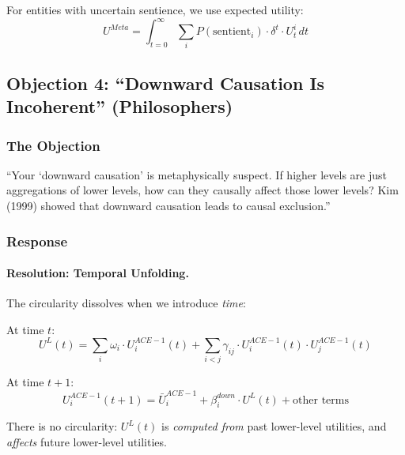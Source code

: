 For entities with uncertain sentience, we use expected utility:
\begin{equation}
U^{Meta} = \int_{t=0}^{\infty} \sum_{i} P(\text{sentient}_i) \cdot \delta^t \cdot U^i_t \, dt
\end{equation}

\subsection{Objection 4: ``Downward Causation Is Incoherent'' (Philosophers)}

\subsubsection{The Objection}

\begin{tcolorbox}[colback=red!5!white, colframe=red!75!black, title=Philosopher's Objection]
``Your `downward causation' is metaphysically suspect. If higher levels are 
just aggregations of lower levels, how can they causally affect those lower 
levels? Kim (1999) showed that downward causation leads to causal exclusion.''
\end{tcolorbox}

\subsubsection{Response}

\paragraph{Resolution: Temporal Unfolding.}

The circularity dissolves when we introduce \textit{time}:

At time $t$:
\begin{equation}
U^L(t) = \sum_i \omega_i \cdot U^{ACE-1}_i(t) + \sum_{i<j} \gamma_{ij} \cdot U^{ACE-1}_i(t) \cdot U^{ACE-1}_j(t)
\end{equation}

At time $t+1$:
\begin{equation}
U^{ACE-1}_i(t+1) = \bar{U}^{ACE-1}_i + \beta^{down}_i \cdot U^L(t) + \text{other terms}
\end{equation}

There is no circularity: $U^L(t)$ is \textit{computed from} past lower-level 
utilities, and \textit{affects} future lower-level utilities.

